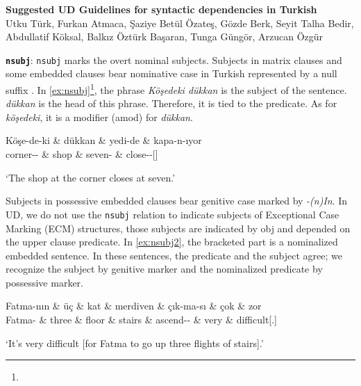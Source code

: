 \documentclass[11pt,a4paper]{article}
\begin{document}
\begin{center}
    {\bf Suggested UD Guidelines for syntactic dependencies in Turkish}\\
    Utku Türk, Furkan Atmaca, Şaziye Betül Özateş, Gözde Berk, Seyit Talha Bedir, Abdullatif Köksal, Balkız Öztürk Başaran, Tunga Güngör, Arzucan Özgür
\end{center}

\textbf{\texttt{nsubj}}:
\texttt{nsubj} marks the overt nominal subjects. Subjects in matrix clauses and some embedded clauses bear nominative case in Turkish represented by a null suffix \citep{goksel2004turkish}. In \autoref{ex:nsubj}\footnote{\printglossaries}, the phrase \textit{Köşedeki dükkan} is the subject of the sentence. \textit{dükkan} is the head of this phrase. Therefore, it is tied to the predicate. As for \textit{köşedeki}, it is a modifier (amod) for \textit{dükkan}.

\begin{exe}
\ex \label{ex:nsubj}
\begin{dependency}
\begin{deptext}
Köşe-de-ki \& dükkan \& yedi-de \& kapa-n-ıyor\\ 
corner-\Loc{}-\Ptcp{} \& shop \& seven-\Loc{} \& close-\Refl{}-\Prog{}[\Tsg]\\
\end{deptext}
\end{dependency}
\glt `The shop at the corner closes at seven.'
\end{exe}

Subjects in possessive embedded clauses bear genitive case marked by \textit{-(n)In}. In UD, we do not use the \texttt{nsubj} relation to indicate subjects of Exceptional Case Marking (ECM) structures, those subjects are indicated by obj and depended on the upper clause predicate. In \autoref{ex:nsubj2}, the bracketed part is a nominalized embedded sentence. In these sentences, the predicate and the subject agree; we recognize the subject by genitive marker and the nominalized predicate by possessive marker.

\begin{exe}
\ex \label{ex:nsubj2}
\begin{dependency}
\begin{deptext}[column sep=0.3cm]
Fatma-nın \& üç \& kat \& merdiven \& çık-ma-sı \& çok \& zor \\ Fatma-\Gen{} \& three \& floor \& stairs \& ascend-\Nmlz{}-\Tsg{} \& very \& difficult[\Cop.\Tsg]\\
\end{deptext}
\end{dependency}
\glt `It’s very difficult [for Fatma to go up three flights of stairs].'
\end{exe}
\end{document}
